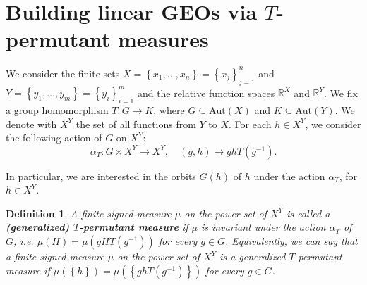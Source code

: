 \documentclass[11pt]{article}
\newcommand{\R}{\mathbb{R}}
\newcommand{\Aut}{\mathrm{Aut}}
\newtheorem{definition}[theorem]{Definition}
\begin{document}
\section{Building linear GEOs via $T$-permutant measures}
\label{Building}

We consider the finite sets $X = \left\{ x_1, \dots, x_n \right\} = \left\{ x_j \right\}_{j=1}^n$ and $Y = \left\{ y_1, \dots, y_m \right\} = \left\{ y_i \right\}_{i=1}^m$ and the relative function spaces $\R^X$ and $\R^Y$.
We fix a group homomorphism $T \colon G \to K$, where $G \subseteq \Aut(X)$ and $K \subseteq \Aut(Y)$. We denote with $X^Y$ the set of all functions from $Y$ to $X$. For each $h \in X^Y$, we consider the following action of $G$ on $X^Y$:
\begin{equation*}
\label{eq:action}
    \alpha_T \colon G \times X^Y \to X^Y, \quad \left( g, h \right) \mapsto g h T(g^{-1}).
\end{equation*}

In particular, we are interested in the orbits $G(h)$ of $h$ under the action $\alpha_T$, for $h \in X^Y$.

\begin{definition}
    A finite signed measure $\mu$ on the power set of $X^Y$ is called a \textbf{(generalized) $T$-permutant measure} if
    $\mu$ is invariant under the action $\alpha_T$ of $G$, i.e. $\mu(H) = \mu(gHT(g^{-1}))$ for every $g \in G$. Equivalently, we can say that a finite signed measure $\mu$ on the power set of $X^Y$ is a generalized $T$-permutant measure if
    $\mu(\left\{h\right\}) = \mu(\left\{ghT(g^{-1})\right\})$ for every $g \in G$.
\end{definition}
\end{document}
